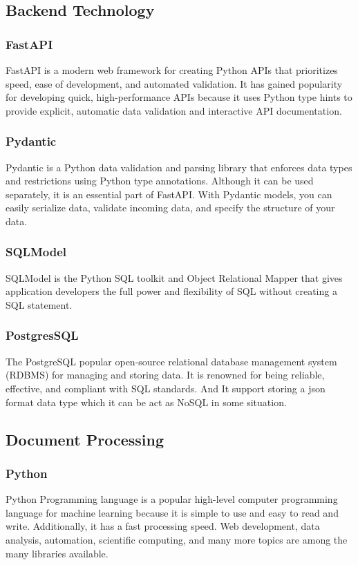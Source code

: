 \documentclass[12pt,oneside,openright,a4paper]{cpe-english-project}
\begin{document}
\subsection{Backend Technology}
\subsubsection{FastAPI} FastAPI is a modern web framework for creating Python APIs that prioritizes speed, ease of development, and automated validation. It has gained popularity for developing quick, high-performance APIs because it uses Python type hints to provide explicit, automatic data validation and interactive API documentation.

\subsubsection{Pydantic} Pydantic is a Python data validation and parsing library that enforces data types and restrictions using Python type annotations. Although it can be used separately, it is an essential part of FastAPI. With Pydantic models, you can easily serialize data, validate incoming data, and specify the structure of your data.

\subsubsection{SQLModel} SQLModel is the Python SQL toolkit and Object Relational Mapper that gives application developers the full power and flexibility of SQL without creating a SQL statement.

\subsubsection{PostgresSQL} The PostgreSQL popular open-source relational database management system (RDBMS) for managing and storing data. It is renowned for being reliable, effective, and compliant with SQL standards. And It support storing a json format data type which it can be act as NoSQL in some situation.

\subsection{Document Processing}
\subsubsection{Python} Python Programming language is a popular high-level computer programming language for machine learning because it is simple to use and easy to read and write. Additionally, it has a fast processing speed. Web development, data analysis, automation, scientific computing, and many more topics are among the many libraries available.
\end{document}
